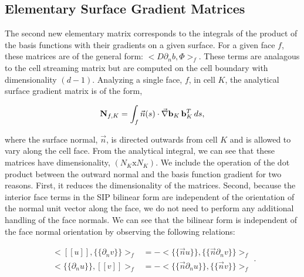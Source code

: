 \subsection{Elementary Surface Gradient Matrices}
\label{sec::DSA_SIP_SurfaceGradient}

The second new elementary matrix corresponds to the integrals of the product of the basis functions with their gradients on a given surface. For a given face $f$, these matrices are of the general form: $\Big<  D \partial_n b, \Phi \Big>_f$. These terms are analagous to the cell streaming matrix but are computed on the cell boundary with dimensionality $(d-1)$. Analyzing a single face, $f$, in cell $K$, the analytical surface gradient matrix is of the form,

\begin{equation}
\label{eq::DSA_surface_gradient_matrix_analytical}
{\bf N}_{f,K}  =    \int_f \vec{n} (s) \cdot \vec{\nabla} {\bf b}_K \, {\bf b}_K^T \, d s ,
\end{equation}

\noindent where the surface normal, $\vec{n}$, is directed outwards from cell $K$ and is allowed to vary along the cell face. From the analytical integral, we can see that these matrices have dimensionality, $(N_K \text{x} N_K )$. We include the operation of the dot product between the outward normal and the basis function gradient for two reasons. First, it reduces the dimensionality of the matrices. Second, because the interior face terms in the SIP bilinear form are independent of the orientation of the normal unit vector along the face, we do not need to perform any additional handling of the face normals. We can see that the bilinear form is independent of the face normal orientation by observing the following relations:

\begin{equation}
\label{eq::DSA_outward_normal_notes}
\begin{aligned}
\Big<  [\![   u ]\!] , \{\!\{   \partial_n v \}\!\}\Big>_{f}  &= - \Big<  \{\!\{ \vec{n}  u \}\!\} , \{\!\{  \vec{n} \partial_n v \}\!\}\Big>_{f} \\
\Big< \{\!\{   \partial_n u \}\!\} ,  [\![   v ]\!]\Big>_{f} &= - \Big<  \{\!\{ \vec{n} \partial_n  u \}\!\} , \{\!\{  \vec{n} v \}\!\}\Big>_{f}
\end{aligned}.
\end{equation}


